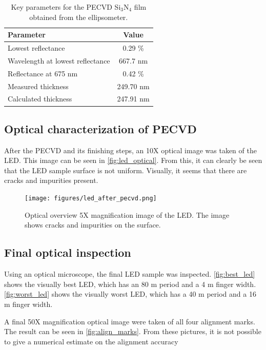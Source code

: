 \begin{table}
    \centering
    \caption{Key parameters for the PECVD Si$_3$N$_4$ film obtained from the ellipsometer.}
    \label{tab:pecvd_ellipsometer}
    \begin{tabular}{lc}
    \hline
    \textbf{Parameter}               & \textbf{Value} \\ \hline
    Lowest reflectance               & 0.29 \%        \\
    Wavelength at lowest reflectance & 667.7 nm       \\
    Reflectance at 675 nm            &  0.42 \%       \\
    Measured thickness               & 249.70 nm      \\
    Calculated thickness             & 247.91 nm      \\ \hline
    \end{tabular}
\end{table}


\subsection{Optical characterization of PECVD}

\noindent After the PECVD and its finishing steps, an 10X optical image was taken of the LED.
This image can be seen in \autoref{fig:led_optical}.
From this, it can clearly be seen that the LED sample surface is not uniform.
Visually, it seems that there are cracks and impurities present.  

\begin{figure}
    \centering
    \texttt{[image: figures/led\_after\_pecvd.png]}
    \caption{Optical overview 5X magnification image of the LED. The image shows cracks and impurities on the surface.}
    \label{fig:led_optical}
\end{figure}


\subsection{Final optical inspection}

\noindent Using an optical microscope, the final LED sample was inspected.
\autoref{fig:best_led} shows the visually best LED, which has an 80 \textmu m period and a 4 \textmu m finger width.
\autoref{fig:worst_led} shows the visually worst LED, which has a 40 \textmu m period and a 16 \textmu m finger width.

A final 50X magnification optical image were taken of all four alignment marks.
The result can be seen in \autoref{fig:align_marks}.
From these pictures, it is not possible to give a numerical estimate on the alignment accuracy

